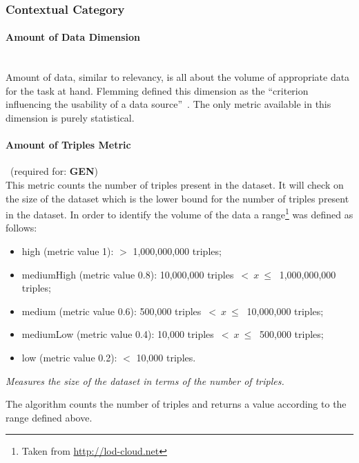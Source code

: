 \subsubsection{Contextual Category}
\label{sec:Contextual} 

\paragraph{Amount of Data Dimension}~\\ %
Amount of data, similar to relevancy, is all about the volume of appropriate data for the task at hand.
Flemming defined this dimension as the ``criterion influencing the usability of a data source''~\cite{Flemming2008}.
The only metric available in this dimension is purely statistical.

\paragraph{Amount of Triples Metric}~(required for: \textbf{GEN})~\\ %
This metric counts the number of triples present in the dataset. 
It will check on the size of the dataset which is the lower bound for the number of triples present in the dataset.
In order to identify the volume of the data a range\footnote{Taken from \url{http://lod-cloud.net}} was defined as follows:
\begin{itemize}
\item high (metric value 1):  $>$ 1,000,000,000 triples;
\item mediumHigh (metric value 0.8): 10,000,000 triples~$<~x~\leq~$ 1,000,000,000 triples;
\item medium (metric value 0.6): 500,000 triples~$<~x~\leq~$ 10,000,000 triples;
\item mediumLow (metric value 0.4): 10,000 triples~$<~x~\leq~$ 500,000 triples;
\item low (metric value 0.2): $<$ 10,000 triples.
\end{itemize}

\begin{mdframed}[style=metricdefinition]
\emph{Measures the size of the dataset in terms of the number of triples.}
\end{mdframed}

The algorithm counts the number of triples and returns a value according to the range defined above.